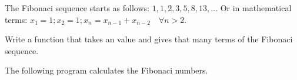 \begin{Exercise}[title={Fibonaci},difficulty=5]
\label{ex:fibonaci}
\Question\label{ex:fibonaci q1}
The Fibonaci sequence starts as follows: $1, 1, 2, 3, 5, 8, 13, \ldots$
Or in mathematical terms: $ x_1 = 1; x_2 = 1; x_n = x_{n-1} +
x_{n-2}\quad\forall n > 2 $.

Write a function that takes an  value and gives 
that many terms of the Fibonaci sequence.

\end{Exercise}

\begin{Answer}
\Question
The following program calculates the Fibonaci numbers.


\showremarks
\end{Answer}
